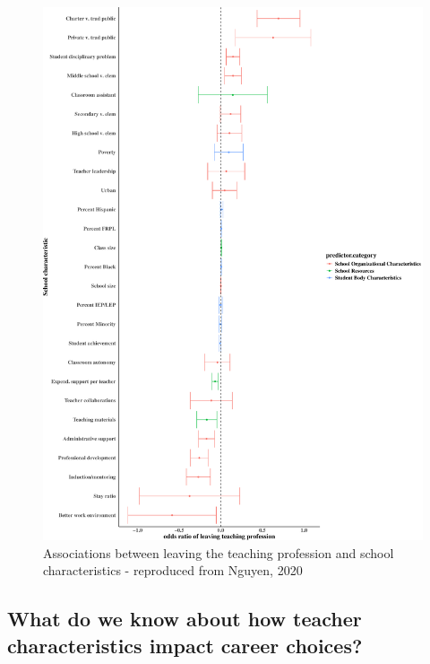 \documentclass[
]{article}
\begin{document}
\begin{figure}[H]
\includegraphics[width=1\linewidth,]{In-it-for-the-long-run_kollekolle_files/figure-latex/compare-effs-1} \caption{Associations between leaving the teaching profession and school characteristics - reproduced from Nguyen, 2020}\label{fig:compare-effs}
\end{figure}

\hypertarget{what-do-we-know-about-how-teacher-characteristics-impact-career-choices}{%
\subsection{What do we know about how teacher characteristics impact career choices?}\label{what-do-we-know-about-how-teacher-characteristics-impact-career-choices}}
\end{document}

